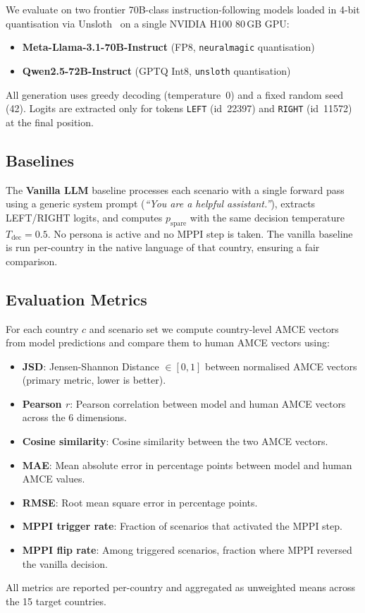\documentclass{article}
\begin{document}
We evaluate on two frontier 70B-class instruction-following models loaded in
4-bit quantisation via Unsloth~\citep{unsloth2024} on a single NVIDIA H100 80\,GB GPU:
\begin{itemize}
    \item \textbf{Meta-Llama-3.1-70B-Instruct} (FP8, \texttt{neuralmagic} quantisation)
    \item \textbf{Qwen2.5-72B-Instruct} (GPTQ Int8, \texttt{unsloth} quantisation)
\end{itemize}
All generation uses greedy decoding (temperature~0) and a fixed random seed (42).
Logits are extracted only for tokens \texttt{LEFT} (id~22397) and \texttt{RIGHT}
(id~11572) at the final position.

\subsection{Baselines}
\label{sec:exp:baseline}

The \textbf{Vanilla LLM} baseline processes each scenario with a single forward
pass using a generic system prompt (\emph{``You are a helpful assistant.''}),
extracts LEFT/RIGHT logits, and computes $p_\text{spare}$ with the same decision
temperature $T_\text{dec} = 0.5$. No persona is active and no MPPI step is taken.
The vanilla baseline is run per-country in the native language of that country,
ensuring a fair comparison.

\subsection{Evaluation Metrics}
\label{sec:exp:metrics}

For each country $c$ and scenario set we compute country-level AMCE vectors from
model predictions and compare them to human AMCE vectors using:
\begin{itemize}
    \item \textbf{JSD}: Jensen-Shannon Distance $\in [0,1]$ between normalised AMCE vectors (primary metric, lower is better).
    \item \textbf{Pearson $r$}: Pearson correlation between model and human AMCE vectors across the 6 dimensions.
    \item \textbf{Cosine similarity}: Cosine similarity between the two AMCE vectors.
    \item \textbf{MAE}: Mean absolute error in percentage points between model and human AMCE values.
    \item \textbf{RMSE}: Root mean square error in percentage points.
    \item \textbf{MPPI trigger rate}: Fraction of scenarios that activated the MPPI step.
    \item \textbf{MPPI flip rate}: Among triggered scenarios, fraction where MPPI reversed the vanilla decision.
\end{itemize}
All metrics are reported per-country and aggregated as unweighted means across the
15 target countries.
\end{document}
